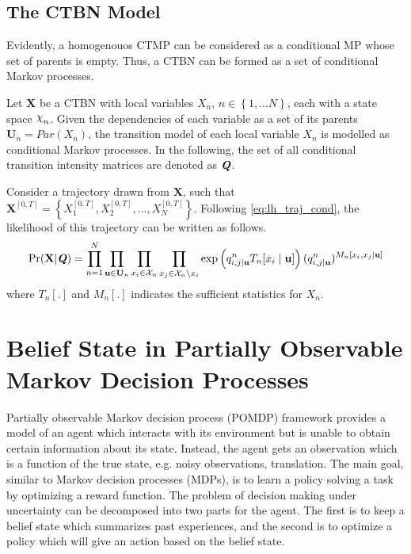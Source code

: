 \subsection{The CTBN Model}
Evidently, a homogenouos CTMP can be considered as a conditional MP whose set of parents is empty. Thus, a CTBN can be formed as a set of conditional Markov processes.

Let \textbf{X} be a CTBN with local variables $ X_n $, $ n \in \left\lbrace 1,...N \right\rbrace $, each with a state space $ \rchi_n $. Given the dependencies of each variable as a set of its parents $ \textbf{U}_n = Par(X_n) $, the transition model of each local variable $ X_n $ is modelled as conditional Markov processes. \cite{Nodelman1995} In the following, the set of all conditional transition intensity matrices are denoted as $ \textbf{\textit{Q}} $.

Consider a trajectory drawn from $ \textbf{X} $, such that $ \textbf{X}^{[0, T]} = \left\lbrace X_1^{[0,T]},  X_2^{[0,T]}, ...,  X_N^{[0,T]}\right\rbrace  $. Following \autoref{eq:lh_traj_cond}, the likelihood of this trajectory can be written as follows.
\begin{align}
\operatorname{Pr}( \textbf{X}  | \textbf{\textit{Q}} ) = \prod_{n=1}^{N} \prod_{\textbf{u} \in \mathcal{\textbf{U}}_{n}} \prod_{x_i \in \mathcal{X}_{n}} \prod_{x_j \in \mathcal{X}_{n} \backslash x_i}
\exp \left(q_{i,j\mid \textbf{u}}^{n} T_{n}[x_i\mid \textbf{u}]\right) (q_{i,j\mid \textbf{u}}^{n})^{M_{n}[x_i, x_j\mid \textbf{u}]}
\label{eq:lh_CTBN}
\end{align}
where $ T_n[.] $ and $ M_n[.] $ indicates the sufficient statistics for $ X_n $.

\section{Belief State in Partially Observable Markov Decision Processes}
\label{sec:belief_POMDP}
Partially observable Markov decision process (POMDP) framework provides a model of an agent which interacts with its environment but is unable to obtain certain information about its state. Instead, the agent gets an observation which is a function of the true state, e.g. noisy observations, translation. The main goal, similar to Markov decision processes (MDPs), is to learn a policy solving a task by optimizing a reward function. The problem of decision making under uncertainty can be decomposed into two parts for the agent. The first is to keep a belief state which summarizes past experiences, and the second is to optimize a policy which will give an action based on the belief state. \cite{KAELBLING199899,Murphy2000}

